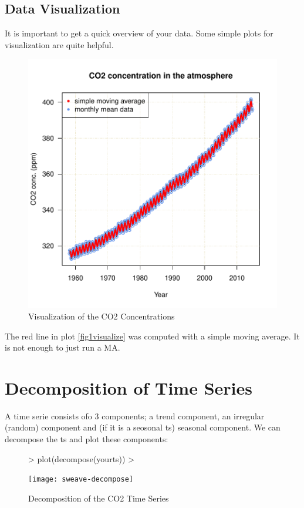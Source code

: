 \documentclass[11pt, a4paper]{article} %
\begin{document}
\subsection{Data Visualization}%
It is important to get a quick overview of your data. Some simple plots for visualization are quite helpful.
\begin{figure}
\centering
\includegraphics{sweave-fig1visualize}
\caption{Visualization of the CO2 Concentrations}
\end{figure}

The red line in plot \ref{fig1visualize} was computed with a simple moving average. It is not enough to just run a MA.

\section{Decomposition of Time Series}%
A time serie consists ofo 3 components; a trend component, an irregular (random) component and (if it is a seosonal ts) seasonal component.
We can decompose the ts and plot these components:

\begin{figure}
\centering
\begin{Schunk}
\begin{Sinput}
> plot(decompose(yourts)) 
> 
\end{Sinput}
\end{Schunk}
\texttt{[image: sweave-decompose]}
\caption{Decomposition of the CO2 Time Series}
\end{figure}
\end{document}
